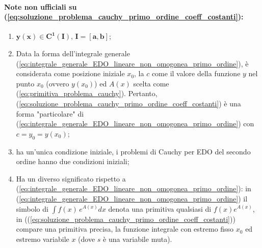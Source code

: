 \paragraph{Note non ufficiali su (\ref{eq:soluzione_problema_cauchy_primo_ordine_coeff_costanti}):}
\begin{enumerate}
    \item $\boldsymbol{y(x)\in C^1(I),\, I=[a,b]}$;
    \item Data la forma dell'integrale generale (\ref{eq:integrale_generale_EDO_lineare_non_omogonea_primo_ordine}), è considerata come posizione iniziale $x_0$, la $c$ come il valore della funzione $y$ nel punto $x_0$ (ovvero $y(x_0)$) ed $A(x)$ scelta come (\ref{eq:primitiva_problema_cauchy}). Pertanto, (\ref{eq:soluzione_problema_cauchy_primo_ordine_coeff_costanti}) è una forma "particolare" di (\ref{eq:integrale_generale_EDO_lineare_non_omogonea_primo_ordine}) con $c=y_0=y(x_0)$;
    \item ha un'unica condizione iniziale, i problemi di Cauchy per EDO del secondo ordine hanno due condizioni iniziali;
    \item Ha un diverso significato rispetto a (\ref{eq:integrale_generale_EDO_lineare_non_omogonea_primo_ordine}): in (\ref{eq:integrale_generale_EDO_lineare_non_omogonea_primo_ordine}) il simbolo di $\int f(x)\, e^{A(x)} dx$ denota una primitiva qualsiasi di $f(x)e^{A(x)}$, in ((\ref{eq:soluzione_problema_cauchy_primo_ordine_coeff_costanti})) compare una primitiva precisa, la funzione integrale con estremo fisso $x_0$ ed estremo variabile $x$ (dove $s$ è una variabile muta).
\end{enumerate}

